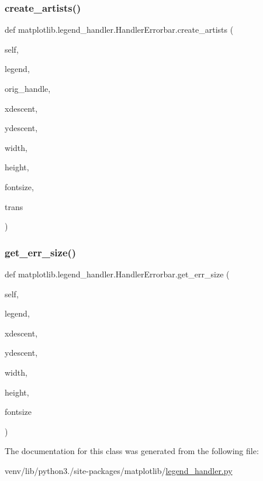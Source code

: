 \subsubsection{\texorpdfstring{create\+\_\+artists()}{create\_artists()}}
{\footnotesize\ttfamily def matplotlib.\+legend\+\_\+handler.\+Handler\+Errorbar.\+create\+\_\+artists (\begin{DoxyParamCaption}\item[{}]{self,  }\item[{}]{legend,  }\item[{}]{orig\+\_\+handle,  }\item[{}]{xdescent,  }\item[{}]{ydescent,  }\item[{}]{width,  }\item[{}]{height,  }\item[{}]{fontsize,  }\item[{}]{trans }\end{DoxyParamCaption})}

\mbox{\label{classmatplotlib_1_1legend__handler_1_1HandlerErrorbar_a5f6e303a1eef5cc3259aad6dc944cb65}} 
\subsubsection{\texorpdfstring{get\+\_\+err\+\_\+size()}{get\_err\_size()}}
{\footnotesize\ttfamily def matplotlib.\+legend\+\_\+handler.\+Handler\+Errorbar.\+get\+\_\+err\+\_\+size (\begin{DoxyParamCaption}\item[{}]{self,  }\item[{}]{legend,  }\item[{}]{xdescent,  }\item[{}]{ydescent,  }\item[{}]{width,  }\item[{}]{height,  }\item[{}]{fontsize }\end{DoxyParamCaption})}



The documentation for this class was generated from the following file\+:\begin{DoxyCompactItemize}
\item 
venv/lib/python3./site-\/packages/matplotlib/\hyperlink{legend__handler_8py}{legend\+\_\+handler.\+py}\end{DoxyCompactItemize}
